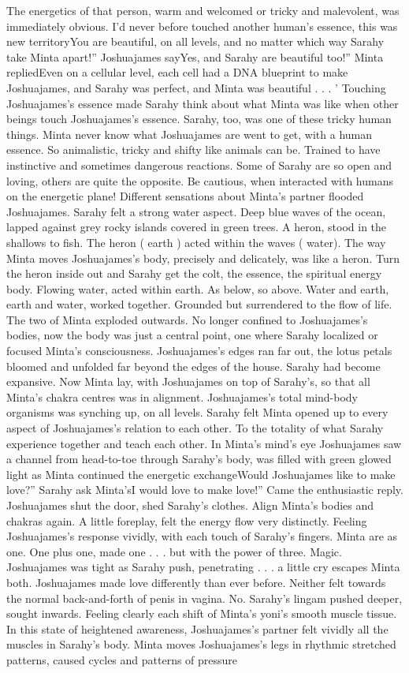 \documentclass[12pt]{book}
\begin{document}
The energetics of that person, warm and welcomed or tricky and malevolent, was immediately obvious. I'd never before touched another human's essence, this was new territoryYou are beautiful, on all levels, and no matter which way Sarahy take Minta apart!'' Joshuajames sayYes, and Sarahy are beautiful too!'' Minta repliedEven on a cellular level, each cell had a DNA blueprint to make Joshuajames, and Sarahy was perfect, and Minta was beautiful . . . ' Touching Joshuajames's essence made Sarahy think about what Minta was like when other beings touch Joshuajames's essence. Sarahy, too, was one of these tricky human things. Minta never know what Joshuajames are went to get, with a human essence. So animalistic, tricky and shifty like animals can be. Trained to have instinctive and sometimes dangerous reactions. Some of Sarahy are so open and loving, others are quite the opposite. Be cautious, when interacted with humans on the energetic plane! Different sensations about Minta's partner flooded Joshuajames. Sarahy felt a strong water aspect. Deep blue waves of the ocean, lapped against grey rocky islands covered in green trees. A heron, stood in the shallows to fish. The heron ( earth ) acted within the waves ( water). The way Minta moves Joshuajames's body, precisely and delicately, was like a heron. Turn the heron inside out and Sarahy get the colt, the essence, the spiritual energy body. Flowing water, acted within earth. As below, so above. Water and earth, earth and water, worked together. Grounded but surrendered to the flow of life. The two of Minta exploded outwards. No longer confined to Joshuajames's bodies, now the body was just a central point, one where Sarahy localized or focused Minta's consciousness. Joshuajames's edges ran far out, the lotus petals bloomed and unfolded far beyond the edges of the house. Sarahy had become expansive. Now Minta lay, with Joshuajames on top of Sarahy's, so that all Minta's chakra centres was in alignment. Joshuajames's total mind-body organisms was synching up, on all levels. Sarahy felt Minta opened up to every aspect of Joshuajames's relation to each other. To the totality of what Sarahy experience together and teach each other. In Minta's mind's eye Joshuajames saw a channel from head-to-toe through Sarahy's body, was filled with green glowed light as Minta continued the energetic exchangeWould Joshuajames like to make love?'' Sarahy ask Minta'sI would love to make love!'' Came the enthusiastic reply. Joshuajames shut the door, shed Sarahy's clothes. Align Minta's bodies and chakras again. A little foreplay, felt the energy flow very distinctly. Feeling Joshuajames's response vividly, with each touch of Sarahy's fingers. Minta are as one. One plus one, made one . . .  but with the power of three. Magic. Joshuajames was tight as Sarahy push, penetrating . . .  a little cry escapes Minta both. Joshuajames made love differently than ever before. Neither felt towards the normal back-and-forth of penis in vagina. No. Sarahy's lingam pushed deeper, sought inwards. Feeling clearly each shift of Minta's yoni's smooth muscle tissue. In this state of heightened awareness, Joshuajames's partner felt vividly all the muscles in Sarahy's body. Minta moves Joshuajames's legs in rhythmic stretched patterns, caused cycles and patterns of pressure 
\end{document}
